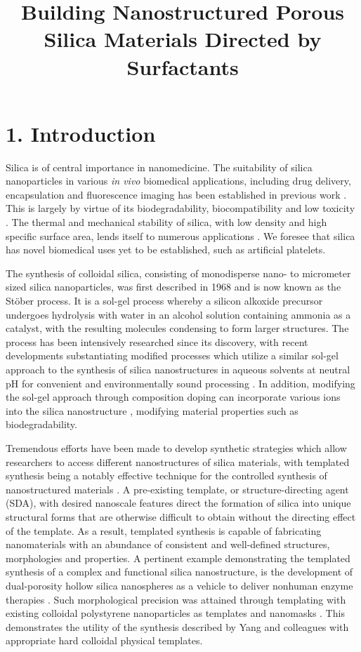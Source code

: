 \documentclass[a4paper,12pt,twocolumn]{article}
\date{}
\title{Building Nanostructured Porous Silica Materials Directed by Surfactants} %
\begin{document}

	\section{1. Introduction}
	Silica is of central importance in nanomedicine. The suitability of silica nanoparticles in various \textit{in vivo} biomedical applications, including drug delivery, encapsulation \cite{slowing2008} and fluorescence imaging \cite{ow2005} has been established in previous work \cite{liberman2014}. This is largely by virtue of its biodegradability, biocompatibility and low toxicity \cite{popplewell1998}. The thermal and mechanical stability of silica, with low density and high specific surface area, lends itself to numerous applications \cite{xu2006}. We foresee that silica has novel biomedical uses yet to be established, such as artificial platelets.
	
The synthesis of colloidal silica, consisting of monodisperse nano- to micrometer sized silica nanoparticles, was first described in 1968 \cite{stober1968} and is now known as the St\"ober process. It is a sol-gel process whereby a silicon alkoxide precursor undergoes hydrolysis with water in an alcohol solution containing ammonia as a catalyst, with the resulting molecules condensing to form larger structures. The process has been intensively researched since its discovery, with recent developments substantiating modified processes which utilize a similar sol-gel approach to the synthesis of silica nanostructures in aqueous solvents at neutral pH for convenient and environmentally sound processing \cite{yang2008}. In addition, modifying the sol-gel approach through composition doping can incorporate various ions into the silica nanostructure \cite{pohaku2012}, modifying material properties such as biodegradability.

Tremendous efforts have been made to develop synthetic strategies which allow researchers to access different nanostructures of silica materials, with templated synthesis being a notably effective technique for the controlled synthesis of nanostructured materials \cite{liu2013}. A pre-existing template, or structure-directing agent (SDA), with desired nanoscale features direct the formation of silica into unique structural forms that are otherwise difficult to obtain without the directing effect of the template. As a result, templated synthesis is capable of fabricating nanomaterials with an abundance of consistent and well-defined structures, morphologies and properties. A pertinent example demonstrating the templated synthesis of a complex and functional silica nanostructure, is the development of dual-porosity hollow silica nanospheres as a vehicle to deliver nonhuman enzyme therapies \cite{ortac2014}. Such morphological precision was attained through templating with existing colloidal polystyrene nanoparticles as templates and nanomasks \cite{trogler2013}. This demonstrates the utility of the synthesis described by Yang and colleagues with appropriate hard colloidal physical templates.
\end{document}
